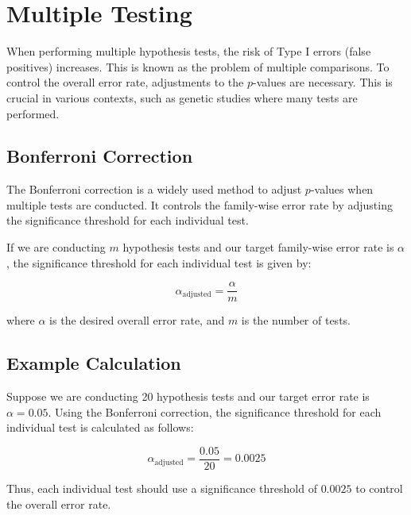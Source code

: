 \documentclass{article}
\begin{document}
\section{Multiple Testing}

When performing multiple hypothesis tests, the risk of Type I errors (false positives) increases. This is known as the problem of multiple comparisons. To control the overall error rate, adjustments to the \( p \)-values are necessary. This is crucial in various contexts, such as genetic studies where many tests are performed.

\subsection{Bonferroni Correction}

The Bonferroni correction is a widely used method to adjust \( p \)-values when multiple tests are conducted. It controls the family-wise error rate by adjusting the significance threshold for each individual test. 

If we are conducting \( m \) hypothesis tests and our target family-wise error rate is \( \alpha \), the significance threshold for each individual test is given by:

\[
\alpha_{\text{adjusted}} = \frac{\alpha}{m}
\]

where \( \alpha \) is the desired overall error rate, and \( m \) is the number of tests.

\subsection{Example Calculation}

Suppose we are conducting 20 hypothesis tests and our target error rate is \( \alpha = 0.05 \). Using the Bonferroni correction, the significance threshold for each individual test is calculated as follows:

\[
\alpha_{\text{adjusted}} = \frac{0.05}{20} = 0.0025
\]

Thus, each individual test should use a significance threshold of \( 0.0025 \) to control the overall error rate.
\end{document}

